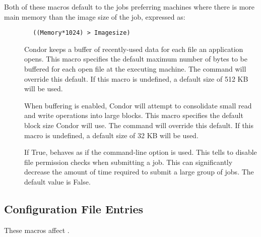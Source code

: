 Both of these macros default to the jobs preferring machines where
there is more main memory than the image size of the job, expressed
as:
\begin{verbatim}
        ((Memory*1024) > Imagesize)
\end{verbatim}

\begin{description}
\item[] \label{param:DefaultBufferSize}
  Condor keeps a buffer of recently-used data for each file an
  application opens.  This macro specifies the default maximum number
  of bytes to be buffered for each open file at the executing machine.
  The   command will override this
  default.  If this macro is undefined, a default size of 512 KB will
  be used.

\item[] 
  \label{param:DefaultBufferBlockSize} When buffering is enabled,
  Condor will attempt to consolidate small read and write operations
  into large blocks.  This macro specifies the default block size
  Condor will use.  The  
  command will override this default.  If this macro is undefined, a
  default size of 32 KB will be used.

\item[] \label{param:SubmitSkipFilecheck}
  If True,  behaves as if the  
  command-line option is used.
  This tells  to disable file permission checks when
  submitting a job.
  This can significantly decrease the amount of time required to submit
  a large group of jobs.
  The default value is False.
\end{description}

\subsection{\label{sec:Preen-Config-File-Entries}
 Configuration File Entries}

These macros affect .

